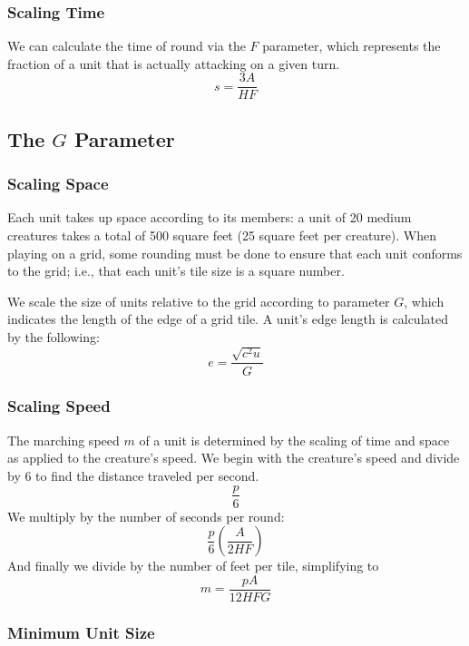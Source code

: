 \subsubsection{Scaling Time}
We can calculate the time of round via the $F$ parameter,
which represents the fraction of a unit that is actually attacking on a given turn.
\[
    s = \frac
        {3 A}
        {H F}
\]

\subsection{The $G$ Parameter}

\subsubsection{Scaling Space}

Each unit takes up space according to its members:
a unit of 20 medium creatures takes a total of 500 square feet (25 square feet per creature).
When playing on a grid,
some rounding must be done to ensure that each unit conforms to the grid;
i.e., that each unit's tile size is a square number.

We scale the size of units relative to the grid
according to parameter $G$,
which indicates the length of the edge of a grid tile.
A unit's edge length is calculated by the following:
\[
    e = \frac
        {\sqrt{c^2 u}}
        {G}
\]

\subsubsection{Scaling Speed}
The marching speed $m$ of a unit is determined
by the scaling of time and space
as applied to the creature's speed.
We begin with the creature's speed and divide by 6
to find the distance traveled per second.
\[
    \frac
        {p}
        {6}
\]
We multiply by the number of seconds per round:
\[
    \frac
        {p}
        {6}
    \left(
        \frac
            {A}
            {2 H F}
    \right)
\]
And finally we divide by the number of feet per tile,
simplifying to
\[
    m = \frac
        {p A}
        {12 H F G}
\]

\subsubsection{Minimum Unit Size}

